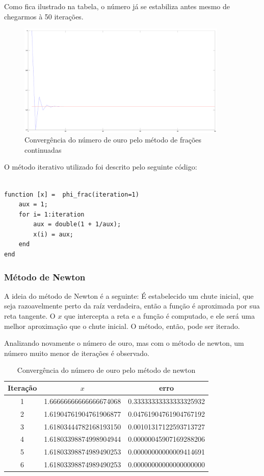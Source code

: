 \documentclass[a4paper]{article}
\begin{document}
Como fica ilustrado na tabela, o número já se estabiliza antes mesmo de chegarmos à 50 iterações.

\begin{figure}[H]
    \centering
    \includegraphics[width=100mm]{golden_frac.png}
    \caption{Convergência do número de ouro pelo método de frações continuadas}
    \label{golden_frac}
\end{figure}


O método iterativo utilizado foi descrito pelo seguinte código:

\begin{lstlisting}

function [x] =  phi_frac(iteration=1)
	aux = 1;
	for i= 1:iteration
		aux = double(1 + 1/aux);
		x(i) = aux;
	end
end

\end{lstlisting}

\subsubsection{Método de Newton}

A ideia do método de Newton é a seguinte: É estabelecido um chute inicial, que seja razoavelmente perto da raíz verdadeira, então a função é aproximada por sua reta tangente. O $x$ que intercepta a reta e a função é computado, e ele será uma melhor aproximação que o chute inicial. O método, então, pode ser iterado.

Analizando novamente o número de ouro, mas com o método de newton, um número muito menor de iterações é observado.

\begin{table}[H]
	\centering
	\begin{tabular}{|c|c|c|}
		\hline
		Iteração & $x$ & erro \\
		\hline
		1 & 1.66666666666666674068 & 0.33333333333333325932 \\
		\hline
		2 & 1.61904761904761906877 & 0.04761904761904767192 \\
		\hline
		3 & 1.61803444782168193150 & 0.00101317122593713727 \\
		\hline
		4 & 1.61803398874998904944 & 0.00000045907169288206 \\
		\hline
		5 & 1.61803398874989490253 & 0.00000000000009414691 \\
		\hline
		6 & 1.61803398874989490253 & 0.00000000000000000000 \\
		\hline
	\end{tabular}
	\label{golden_newton}
	\caption{Convergência do número de ouro pelo método de newton}
\end{table}
\end{document}
